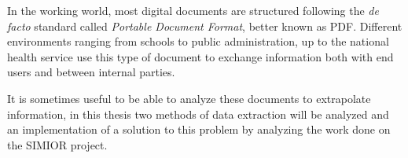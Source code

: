 \vspace{4cm}
In the working world, most digital documents are structured following the \textit{de facto} standard called \textit{Portable Document Format}, better known as PDF. Different environments ranging from schools to public administration, up to the national health service use this type of document to exchange information both with end users and between internal parties.
\par\bigskip
It is sometimes useful to be able to analyze these documents to extrapolate information, in this thesis two methods of data extraction will be analyzed and an implementation of a solution to this problem by analyzing the work done on the SIMIOR project.
